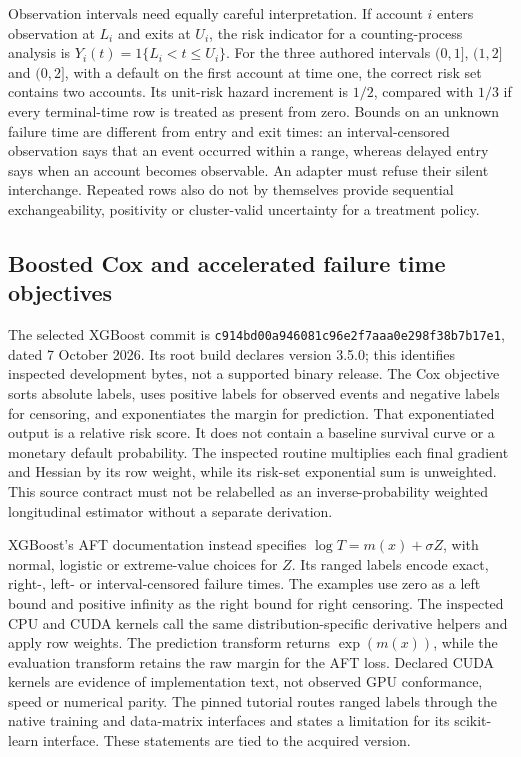 Observation intervals need equally careful interpretation. If account $i$
enters observation at $L_i$ and exits at $U_i$, the risk indicator for a
counting-process analysis is $Y_i(t)=1\{L_i<t\leq U_i\}$. For the three
authored intervals $(0,1]$, $(1,2]$ and $(0,2]$, with a default on the first
account at time one, the correct risk set contains two accounts. Its unit-risk
hazard increment is $1/2$, compared with $1/3$ if every terminal-time row is
treated as present from zero. Bounds on an unknown failure time are different
from entry and exit times: an interval-censored observation says that an event
occurred within a range, whereas delayed entry says when an account becomes
observable. An adapter must refuse their silent interchange. Repeated rows also
do not by themselves provide sequential exchangeability, positivity or
cluster-valid uncertainty for a treatment policy.\citep{exec24_longcxx_reference}

\subsection{Boosted Cox and accelerated failure time objectives}

The selected XGBoost commit is
\texttt{c914bd00a946081c96e2f7aaa0e298f38b7b17e1}, dated 7 October 2026.
Its root build declares version 3.5.0; this identifies inspected development
bytes, not a supported binary release. The Cox objective sorts absolute labels,
uses positive labels for observed events and negative labels for censoring,
and exponentiates the margin for prediction. That exponentiated output is a
relative risk score. It does not contain a baseline survival curve or a monetary
default probability. The inspected routine multiplies each final gradient and
Hessian by its row weight, while its risk-set exponential sum is unweighted.
This source contract must not be relabelled as an inverse-probability weighted
longitudinal estimator without a separate derivation.\citep{exec24_longcxx_xgboost}

XGBoost's AFT documentation instead specifies
$\log T=m(x)+\sigma Z$, with normal, logistic or extreme-value choices for
$Z$. Its ranged labels encode exact, right-, left- or interval-censored failure
times. The examples use zero as a left bound and positive infinity as the right
bound for right censoring. The inspected CPU and CUDA kernels call the same
distribution-specific derivative helpers and apply row weights. The prediction
transform returns $\exp(m(x))$, while the evaluation transform retains the raw
margin for the AFT loss. Declared CUDA kernels are evidence of implementation
text, not observed GPU conformance, speed or numerical parity. The pinned
tutorial routes ranged labels through the native training and data-matrix
interfaces and states a limitation for its scikit-learn interface. These
statements are tied to the acquired version.\citep{exec24_longcxx_xgboost}

